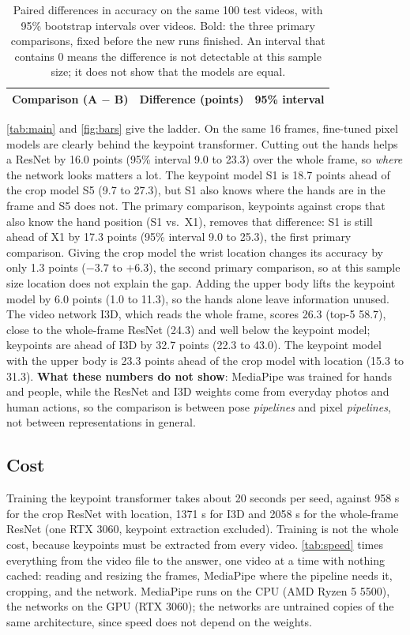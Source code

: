 \documentclass{article}
\begin{document}
\begin{table}[t]
\centering\small\setlength{\tabcolsep}{4pt}
\begin{tabular}{lrr}
\toprule
Comparison (A $-$ B) & Difference (points) & 95\% interval \\
\midrule

\bottomrule
\end{tabular}
\caption{Paired differences in accuracy on the same 100 test videos, with 95\% bootstrap intervals over videos. Bold: the
three primary comparisons, fixed before the new runs finished. An interval that contains 0 means the difference is not
detectable at this sample size; it does not show that the models are equal.}
\label{tab:paired}
\end{table}

\cref{tab:main} and \cref{fig:bars} give the ladder. On the same 16 frames, fine-tuned pixel models are clearly behind
the keypoint transformer. Cutting out the hands helps a ResNet by 16.0 points (95\% interval 9.0 to 23.3) over the whole
frame, so \emph{where} the network looks matters a lot. The keypoint model S1 is 18.7 points ahead of the crop model S5 (9.7 to 27.3), but S1 also knows where the hands are
in the frame and S5 does not. The primary comparison, keypoints against crops that also know the hand position (S1 vs.\ X1),
removes that difference: S1 is still ahead of X1 by 17.3 points (95\% interval 9.0 to 25.3), the first primary
comparison. Giving the crop model the wrist location changes its accuracy by only 1.3 points ($-3.7$ to $+6.3$), the second
primary comparison, so at this sample size location does not explain the gap. Adding the upper body lifts the keypoint model by 6.0 points (1.0 to 11.3), so
the hands alone leave information unused. The video network I3D, which reads the whole frame, scores 26.3 (top-5 58.7),
close to the whole-frame ResNet (24.3) and well below the keypoint model; keypoints are ahead of I3D by 32.7 points (22.3 to 43.0).
The keypoint model with the upper body is 23.3 points ahead of the crop model with location (15.3 to 31.3). \textbf{What these numbers do not show}: MediaPipe was trained for hands and
people, while the ResNet and I3D weights come from everyday photos and human actions, so the comparison is between pose
\emph{pipelines} and pixel \emph{pipelines}, not between representations in general.

\subsection{Cost}
Training the keypoint transformer takes about 20 seconds per seed, against 958 s for the crop ResNet with location, 1371 s
for I3D and 2058 s for the whole-frame ResNet (one RTX 3060, keypoint extraction excluded). Training is not the whole
cost, because keypoints must be extracted from every video. \cref{tab:speed} times everything from the video file to the
answer, one video at a time with nothing cached: reading and resizing the frames, MediaPipe where the pipeline needs it,
cropping, and the network. MediaPipe runs on the CPU (AMD Ryzen 5 5500), the networks on the GPU (RTX 3060); the networks
are untrained copies of the same architecture, since speed does not depend on the weights.
\end{document}
